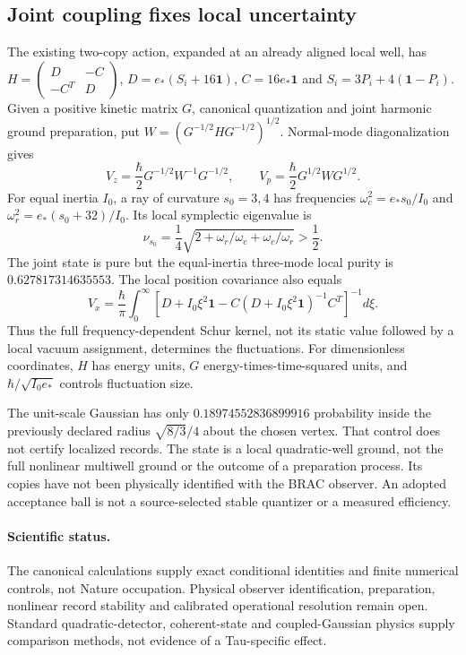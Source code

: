 \documentclass[11pt]{article}
\begin{document}
\subsection{Joint coupling fixes local uncertainty}
The existing two-copy action, expanded at an already aligned local well,
has $H=\left(\begin{smallmatrix}D&-C\\-C^T&D\end{smallmatrix}\right)$,
$D=e_*(S_i+16\mathbf1)$, $C=16e_*\mathbf1$ and
$S_i=3P_i+4(\mathbf1-P_i)$. Given a positive kinetic matrix $G$,
canonical quantization and joint harmonic ground preparation, put
$W=(G^{-1/2}HG^{-1/2})^{1/2}$. Normal-mode diagonalization gives
\begin{equation}
 V_z=\frac\hbar2G^{-1/2}W^{-1}G^{-1/2},\qquad
 V_p=\frac\hbar2G^{1/2}WG^{1/2}.
\end{equation}
For equal inertia $I_0$, a ray of curvature $s_0=3,4$ has frequencies
$\omega_c^2=e_*s_0/I_0$ and $\omega_r^2=e_*(s_0+32)/I_0$. Its local
symplectic eigenvalue is
\begin{equation}
 \nu_{s_0}=\frac14\sqrt{2+\omega_r/\omega_c+\omega_c/\omega_r}>\frac12.
\end{equation}
The joint state is pure but the equal-inertia three-mode local purity is
$0.627817314635553$. The local position covariance also equals
\begin{equation}
 V_x=\frac\hbar\pi\int_0^\infty
 \left[D+I_0\xi^2\mathbf1-C(D+I_0\xi^2\mathbf1)^{-1}C^T\right]^{-1}d\xi.
\end{equation}
Thus the full frequency-dependent Schur kernel, not its static value followed
by a local vacuum assignment, determines the fluctuations. For dimensionless
coordinates, $H$ has energy units, $G$ energy-times-time-squared units, and
$\hbar/\sqrt{I_0e_*}$ controls fluctuation size.

The unit-scale Gaussian has only $0.18974552836899916$ probability inside
the previously declared radius $\sqrt{8/3}/4$ about the chosen vertex.
That control does not certify localized records. The state is a local
quadratic-well ground, not the full nonlinear multiwell ground or the
outcome of a preparation process. Its copies have not been physically
identified with the BRAC observer. An adopted acceptance ball is not a
source-selected stable quantizer or a measured efficiency.

\paragraph{Scientific status.}
The canonical calculations supply exact conditional identities and finite
numerical controls, not Nature occupation. Physical observer identification,
preparation, nonlinear record stability and calibrated operational resolution
remain open. Standard quadratic-detector, coherent-state and coupled-Gaussian
physics supply comparison methods, not evidence of a Tau-specific effect.
\end{document}
